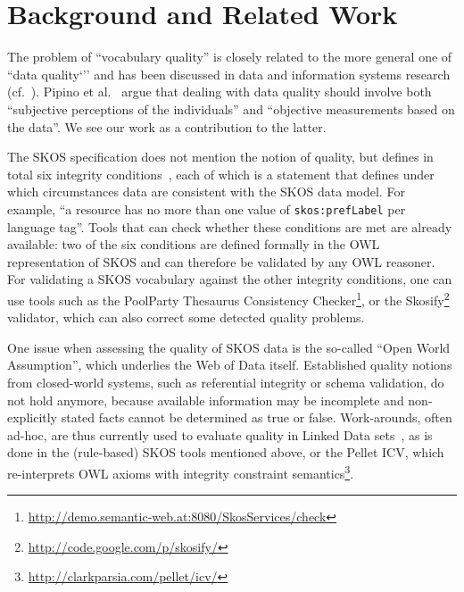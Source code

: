 
\section{Background and Related Work}\label{sec:background}

The problem of ``vocabulary quality'' is closely related to the more general one of ``data quality`'' and has been discussed in data and information systems research (cf.~\cite{Batini2009}). Pipino et al.~\cite{Pipino2002} argue that dealing with data quality should involve both ``subjective perceptions of the individuals'' and ``objective measurements based on the data''. We see our work as a contribution to the latter.

The SKOS specification does not mention the notion of quality, but defines in total six integrity conditions~\cite{SkosReference2008}, each of which is a statement that defines under which circumstances data are consistent with the SKOS data model. For example, ``a resource has no more than one value of \texttt{skos:prefLabel} per language tag''. Tools that can check whether these conditions are met are already available: two of the six conditions are defined formally in the OWL representation of SKOS and can therefore be validated by any OWL reasoner. For validating a SKOS vocabulary against the other integrity conditions, one can use tools such as the PoolParty Thesaurus Consistency Checker\footnote{\url{http://demo.semantic-web.at:8080/SkosServices/check}}, or the Skosify\footnote{\url{http://code.google.com/p/skosify/}} validator, which can also correct some detected quality problems.

One issue when assessing the quality of SKOS data is the so-called ``Open World Assumption'', which underlies the Web of Data itself. Established quality notions from closed-world systems, such as referential integrity or schema validation, do not hold anymore, because available information may be incomplete and non-explicitly stated facts cannot be determined as true or false. Work-arounds, often ad-hoc, are thus currently used to evaluate quality in Linked Data sets~\cite{Heath2011}, as is done in the (rule-based) SKOS tools mentioned above, or the Pellet ICV, which re-interprets OWL axioms with integrity constraint semantics\footnote{\url{http://clarkparsia.com/pellet/icv/}}.



